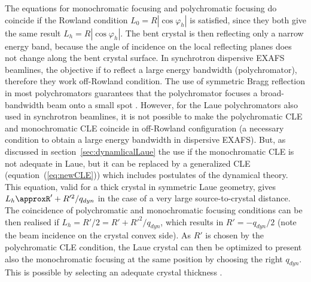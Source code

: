 \documentclass[preprint]{iucr}              %
\newcommand{\inblue}[1]{{\color{black}#1}}
\begin{document}
The equations for monochromatic focusing and polychromatic focusing do coincide if the Rowland condition $L_0=R|\cos\varphi_h|$ is satisfied, since they both give the same result $L_h=R|\cos\varphi_h|$. The bent crystal is then reflecting only a narrow energy band, because the angle of incidence on the local reflecting planes does not change along the bent crystal surface.
\inblue{In synchrotron dispersive EXAFS beamlines, the objective if to reflect a large energy bandwidth (polychromator), therefore they work off-Rowland condition. The use of symmetric Bragg reflection in most polychromators guarantees that the polychromator focuses a broad-bandwidth beam onto a small spot \cite{Tolentino:ms0206}. However, for the Laue polychromators also used in synchrotron beamlines, it is not possible to make the polychromatic CLE and monochromatic CLE coincide in off-Rowland configuration (a necessary condition to obtain a large energy bandwidth in dispersive EXAFS). But, as discussed in section~\ref{sec:dynamlicalLaue} the use if the monochromatic CLE is not adequate in Laue, but it can be replaced by a generalized CLE (equation~(\ref{eq:newCLE})) which includes postulates of the dynamical theory.  
This equation, valid for a thick crystal in symmetric Laue geometry, gives $L_h\approxR'+R'^2/q_{dyn}$ in the case of a very large source-to-crystal distance. The coincidence of polychromatic and monochromatic focusing conditions can be then realised if $L_h=R'/2=R'+R'^2/q_{dyn}$, which results in $R'=-q_{dyn}/2$ (note the beam incidence on the crystal convex side). As $R'$ is chosen by the polychromatic CLE condition, the Laue crystal can then be optimized to present also the monochromatic focusing at the same position by choosing the right $q_{dyn}$. This is possible by selecting an adequate crystal thickness \cite{Mocella2004} \cite{Mocella2008}. 
}
\end{document}
